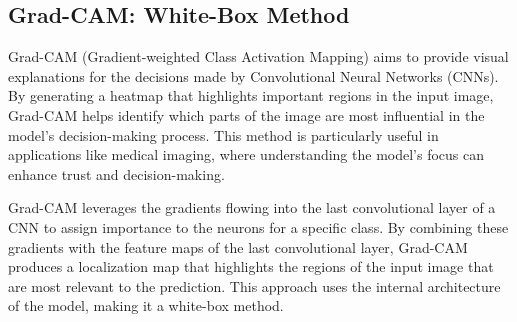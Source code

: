 \documentclass{article}
\begin{document}
\subsection{Grad-CAM: White-Box Method}

Grad-CAM (Gradient-weighted Class Activation Mapping) aims to provide visual explanations for the decisions made by Convolutional Neural Networks (CNNs). By generating a heatmap that highlights important regions in the input image, Grad-CAM helps identify which parts of the image are most influential in the model’s decision-making process. This method is particularly useful in applications like medical imaging, where understanding the model’s focus can enhance trust and decision-making.

Grad-CAM leverages the gradients flowing into the last convolutional layer of a CNN to assign importance to the neurons for a specific class. By combining these gradients with the feature maps of the last convolutional layer, Grad-CAM produces a localization map that highlights the regions of the input image that are most relevant to the prediction. This approach uses the internal architecture of the model, making it a white-box method.
\end{document}
